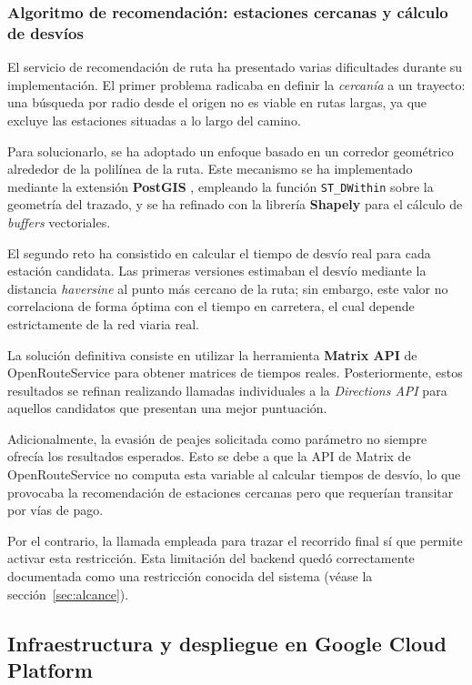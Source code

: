 \subsubsection*{Algoritmo de recomendación: estaciones cercanas y cálculo de desvíos}

El servicio de recomendación de ruta ha presentado varias dificultades durante su
implementación. El primer problema radicaba en definir la \textit{cercanía} a un trayecto:
una búsqueda por radio desde el origen no es viable en rutas largas, ya que excluye
las estaciones situadas a lo largo del camino.

Para solucionarlo, se ha adoptado un enfoque basado en un corredor geométrico alrededor de la
polilínea de la ruta. Este mecanismo se ha implementado mediante la extensión
\textbf{PostGIS} \cite{postgis}, empleando la función \texttt{ST\_\allowbreak DWithin} sobre
la geometría del trazado, y se ha refinado con la librería \textbf{Shapely} para el
cálculo de \textit{buffers} vectoriales.

El segundo reto ha consistido en calcular el tiempo de desvío real para cada estación candidata.
Las primeras versiones estimaban el desvío mediante la distancia \textit{haversine} al punto
más cercano de la ruta; sin embargo, este valor no correlaciona de forma óptima con el tiempo
en carretera, el cual depende estrictamente de la red viaria real.

La solución definitiva consiste en utilizar la herramienta \textbf{Matrix API} de
OpenRouteService \cite{openrouteservice_api} para obtener matrices de tiempos reales.
Posteriormente, estos resultados se refinan realizando llamadas individuales a la
\textit{Directions API} para aquellos candidatos que presentan una mejor puntuación.

Adicionalmente, la evasión de peajes solicitada como parámetro no siempre ofrecía los resultados
esperados. Esto se debe a que la API de Matrix de OpenRouteService no computa esta variable
al calcular tiempos de desvío, lo que provocaba la recomendación de estaciones cercanas
pero que requerían transitar por vías de pago.

Por el contrario, la llamada empleada para trazar el recorrido final sí que permite activar
esta restricción. Esta limitación del backend quedó correctamente documentada como una
restricción conocida del sistema (véase la sección~\ref{sec:alcance}).

\subsection{Infraestructura y despliegue en Google Cloud Platform}
\label{subsec:inc_gcp}

